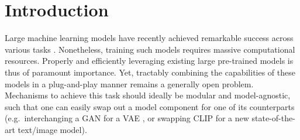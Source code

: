 \documentclass[nohyperref]{article}
\theoremstyle{plain}
\theoremstyle{definition}
\theoremstyle{remark}
\begin{document}
\section{Introduction}
Large machine learning models have recently achieved remarkable success across various tasks \citep{brown2020language, jia2021scaling, nichol2021glide, chowdhery2022palm, rombach2022high, yu2022scaling, ramesh2022hierarchical, saharia2022photorealistic, reed2022a}. 
Nonetheless, training such models requires massive computational resources. 
Properly and efficiently leveraging existing large pre-trained models is thus of paramount importance. 
Yet, tractably combining the capabilities of these models in a plug-and-play manner remains a generally open problem. 
Mechanisms to achieve this task should ideally be modular and model-agnostic, such that one can easily swap out a model component for one of its counterparts (e.g.\ interchanging a GAN \citep{goodfellow2014generative} for a VAE \citep{kingma2013auto, rezende2014stochastic}, or swapping CLIP \citep{radford2021learning} for a new state-of-the-art text/image model). 
\end{document}
